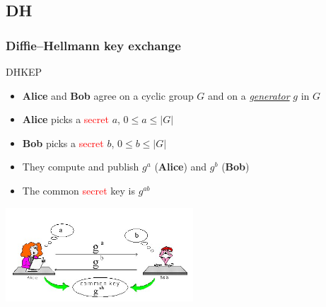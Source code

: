 \documentclass[10pt,handout]{beamer} %
\theoremstyle{definition}
\begin{document}
\subsection{DH}
\begin{frame}
\frametitle{Diffie--Hellmann key exchange}\pause

\begin{beamerboxesrounded}[upper=block title example,lower=block body alerted,shadow=true]{DHKEP}
\begin{itemize}
\item[\textcolor{blue}{\ding{182}}] \textbf{Alice} and
\textbf{Bob} agree on a cyclic group $G$ and on a \textit{\underline{generator}} $g$ in
$G$
 \item[\textcolor{blue}{\ding{183}}] {\textbf{Alice}
 picks a \textcolor{red}{secret} $a$,} {$0\leq a\leq |G|$}
 \item[\textcolor{blue}{\ding{184}}] {\textbf{Bob} picks
 a \textcolor{red}{secret} $b$, $0\leq b\leq |G|$}
 \item[\textcolor{blue}{\ding{185}}] {They compute and publish $g^a$
 (\textbf{Alice}) and $g^b$ (\textbf{Bob})}
 \item[\textcolor{blue}{\ding{186}}] {The common
 \textcolor{red}{secret} key is $g^{ab}$}
\end{itemize}
\end{beamerboxesrounded}

\centerline{\includegraphics[width=7cm]{images/dh.jpg}}
\end{frame}
\end{document}
